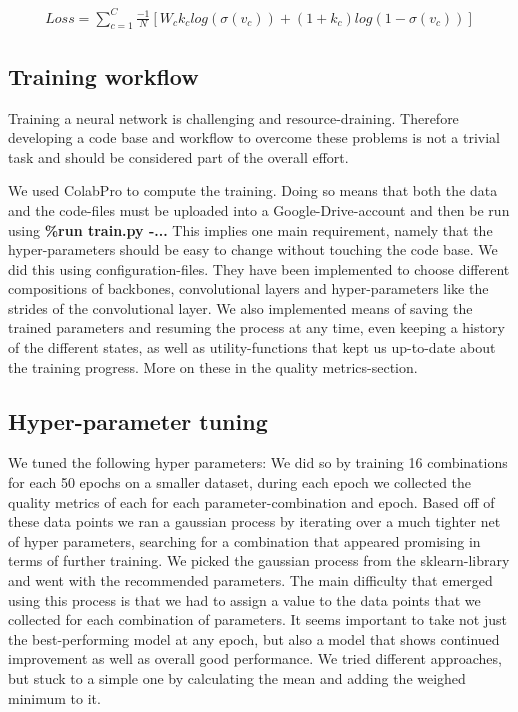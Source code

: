 \begin{align}
	Loss = \sum_{c=1}^C\frac{-1}{N}[W_ck_clog(\sigma(v_c)) + (1+k_c)log(1-\sigma(v_c))]\label{Equ1}
\end{align}


\subsection{Training workflow}

Training a neural network is challenging and resource-draining. Therefore developing a code base and workflow to overcome these problems is not a trivial task and should be considered part of the overall effort. 

We used ColabPro to compute the training. Doing so means that both the data and the code-files must be uploaded into a Google-Drive-account and then be run using
\newline \textbf{\%run train.py -...} 
\newline This implies one main requirement, namely that the hyper-parameters should be easy to change without touching the code base. We did this using configuration-files. They have been implemented to choose different compositions of backbones, convolutional layers and hyper-parameters like the strides of the convolutional layer. We also implemented means of saving the trained parameters and resuming the process at any time, even keeping a history of the different states, as well as utility-functions that kept us up-to-date about the training progress. More on these in the quality metrics-section. 

\subsection{Hyper-parameter tuning}
We tuned the following hyper parameters: 
We did so by training 16 combinations for each 50 epochs on a smaller dataset, during each epoch we collected the quality metrics of each for each parameter-combination and epoch. Based off of these data points we ran a gaussian process by iterating over a much tighter net of hyper parameters, searching for a combination that appeared promising in terms of further training. We picked the gaussian process from the sklearn-library and went with the recommended parameters.
The main difficulty that emerged using this process is that we had to assign a value to the data points that we collected for each combination of parameters. It seems important to take not just the best-performing model at any epoch, but also a model that shows continued improvement as well as overall good performance. We tried different approaches, but stuck to a simple one by calculating the mean and adding the weighed minimum to it. 

